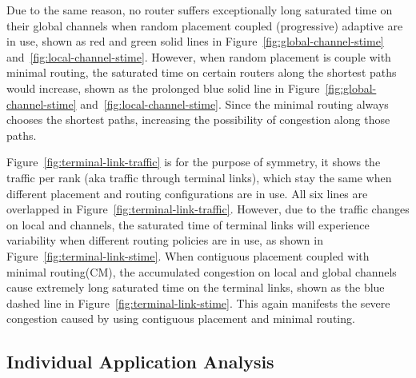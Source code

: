Due to the same reason, no router suffers exceptionally long saturated time on their global channels when random placement coupled (progressive) adaptive are in use, shown as red and green solid lines in Figure~\ref{fig:global-channel-stime} and~\ref{fig:local-channel-stime}. However, when random placement is couple with minimal routing, the saturated time on certain routers along the shortest paths would increase, shown as the prolonged blue solid line in Figure~\ref{fig:global-channel-stime} and~\ref{fig:local-channel-stime}. Since the minimal routing always chooses the shortest paths, increasing the possibility of congestion along those paths. 



Figure~\ref{fig:terminal-link-traffic} is for the purpose of symmetry, it shows the traffic per rank (aka traffic through terminal links), which stay the same when different placement and routing configurations are in use. All six lines are overlapped in Figure~\ref{fig:terminal-link-traffic}. However, due to the traffic changes on local and channels, the saturated time of terminal links will experience variability when different routing policies are in use, as shown in Figure~\ref{fig:terminal-link-stime}. When contiguous placement coupled with minimal routing(CM), the accumulated congestion on local and global channels cause extremely long saturated time on the terminal links, shown as the blue dashed line in Figure~\ref{fig:terminal-link-stime}. This again manifests the severe congestion caused by using contiguous placement and minimal routing. 




\subsection{Individual Application Analysis}
\label{sec: workload-1 app analysis}

